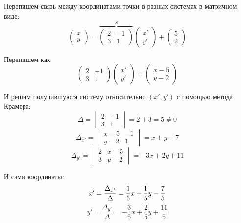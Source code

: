 \documentclass[a4paper,12pt]{article}
\begin{document}
  \begin{solution}
    Перепишем связь между координатами точки в разных системах в матричном виде:
    \begin{equation}\label{eq:problem1-x-to-x-prime}
      \begin{pmatrix}
        x\\
        y
      \end{pmatrix}
      = \overbrace{\begin{pmatrix}
        2 & -1\\
        3 & 1
      \end{pmatrix}}^{S}
      \begin{pmatrix}
        x'\\
        y'
      \end{pmatrix}
      + \begin{pmatrix}
        5\\
        2
      \end{pmatrix}
    \end{equation}
    
    Перепишем как
    \[
      \begin{pmatrix}
        2 & -1\\
        3 & 1
      \end{pmatrix}
      \begin{pmatrix}
        x'\\
        y'
      \end{pmatrix}
      = \begin{pmatrix}
        x - 5\\
        y - 2
      \end{pmatrix}
    \]
    
    И решим получившуюся систему относительно $(x', y')$ с помощью метода Крамера:
    \[
      \Delta = \begin{vmatrix} 2 & -1 \\ 3 & 1 \end{vmatrix} = 2 + 3 = 5 \not= 0
    \]
    \[
      \Delta_{x'} = \begin{vmatrix} x - 5 & -1 \\ y - 2 & 1 \end{vmatrix} = x + y - 7
    \]
    \[
      \Delta_{y'} = \begin{vmatrix} 2 & x - 5 \\ 3 & y - 2 \end{vmatrix} = -3x + 2y + 11
    \]
    
    И сами координаты:
    \[
      x' = \frac{\Delta_{x'}}{\Delta} = \frac{1}{5} x + \frac{1}{5} y - \frac{7}{5}\\
    \]
    \[
      y' = \frac{\Delta_{y'}}{\Delta} = -\frac{3}{5} x + \frac{2}{5} y + \frac{11}{5}
    \]
    

\end{solution}
\end{document}
